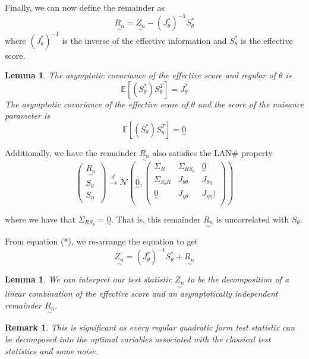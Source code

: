 \documentclass[twoside]{article}
\newtheorem{lemma}[theorem]{Lemma}
\newtheorem{remark}[theorem]{Remark}
\newcommand{\utilde}{\underset{\sim}}
\begin{document}
Finally, we can now define the remainder as 
\begin{equation}
\utilde{R_n} = \utilde{Z_n} - (J_{\theta}^{*})^{-1}S_{\theta}^{*}
\tag{*}
\end{equation}
where $(J_{\theta}^{*})^{-1}$ is the inverse of the effective information and  $S_{\theta}^{*}$ is the effective score. 

\begin{lemma}The asymptotic covariance of the effective score and regular of $\theta$ is 
$$
\mathbb{E}[(S_{\theta}^*)S_{\theta}^T] = J_{\theta}^*
$$
The asymptotic covariance of the effective score of $\theta$ and the score of the nuisance parameter is 
$$
\mathbb{E}[(S_{\theta}^*)S_{\eta}^T] = \utilde{0}
$$
\end{lemma}

Additionally, we have the remainder $\utilde{R_n}$ also satisfies the LAN\# property
$$
\begin{pmatrix}
\utilde{R_n}\\
S_{\theta}\\
S_{\eta}
\end{pmatrix}
\xrightarrow{d}
\mathcal{N}(\utilde{0}, \begin{pmatrix} \Sigma_R & \Sigma_{R S_{\theta}} & \utilde{0}\\ \Sigma_{S_{\theta}R} & J_{\theta \theta} & J_{\theta \eta}\\ \utilde{0} & J_{\eta \theta} & J_{\eta \eta})\\
\end{pmatrix})
$$

where we have that $\Sigma_{R S_{\theta}} = \utilde{0}.$ That is, this remainder $\utilde{R_n}$ is uncorrelated with $S_{\theta}.$

From equation (*), we re-arrange the equation to get 
$$
\utilde{Z_n} = (J_{\theta}^{*})^{-1}S_{\theta}^{*} + \utilde{R_n}
$$

\begin{lemma}We can interpret our test statistic $\utilde{Z_n}$ to be the decomposition of a linear combination of the effective score and an asymptotically independent remainder $\utilde{R_n}.$
\end{lemma}

\begin{remark}This is significant as every regular quadratic form test statistic can be decomposed into the optimal variables associated with the classical test statistics and some noise.
\end{remark}
\end{document}
